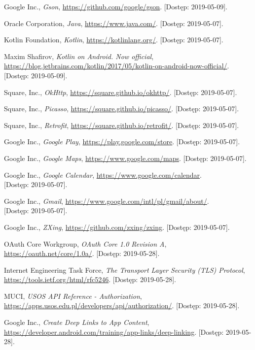 \documentclass{pracamgr}
\begin{document}
\begin{thebibliography}{99}
 Google Inc., \textit{Gson},	\url{https://github.com/google/gson}. [Dostęp: 2019-05-09].

 Oracle Corporation, \textit{Java}, \url{https://www.java.com/}. [Dostęp: 2019-05-07].

 Kotlin Foundation, \textit{Kotlin}, \url{https://kotlinlang.org/}. [Dostęp: 2019-05-07].

 Maxim Shafirov, \textit{Kotlin on Android. Now official},
	\url{https://blog.jetbrains.com/kotlin/2017/05/kotlin-on-android-now-official/}. [Dostęp: 2019-05-09].

 Square, Inc., \textit{OkHttp},	\url{https://square.github.io/okhttp/}. [Dostęp: 2019-05-07].

 Square, Inc., \textit{Picasso}, \url{https://square.github.io/picasso/}. [Dostęp: 2019-05-07].

 Square, Inc., \textit{Retrofit}, \url{https://square.github.io/retrofit/}. [Dostęp: 2019-05-07].


 Google Inc., \textit{Google Play}, \url{https://play.google.com/store}. [Dostęp: 2019-05-07].

 Google Inc., \textit{Google Maps},	\url{https://www.google.com/maps}. [Dostęp: 2019-05-07].

 Google Inc., \textit{Google Calendar},	\url{https://www.google.com/calendar}.\\
{[Dostęp: 2019-05-07]}.

 Google Inc., \textit{Gmail}, \url{https://www.google.com/intl/pl/gmail/about/}.\\
{[Dostęp: 2019-05-07]}.

 Google Inc., \textit{ZXing}, \url{https://github.com/zxing/zxing}. [Dostęp: 2019-05-07].

 OAuth Core Workgroup, \textit{OAuth Core 1.0 Revision A}, \url{https://oauth.net/core/1.0a/}. [Dostęp: 2019-05-28].

 Internet Engineering Task Force, \textit{The Transport Layer Security (TLS) Protocol}, \url{https://tools.ietf.org/html/rfc5246}. [Dostęp: 2019-05-28].

 MUCI, \textit{USOS API Reference - Authorization}, \url{https://apps.usos.edu.pl/developers/api/authorization/}. [Dostęp: 2019-05-28].

 Google Inc., \textit{Create Deep Links to App Content}, \url{https://developer.android.com/training/app-links/deep-linking}. [Dostęp: 2019-05-28].


\end{thebibliography}
\end{document}
